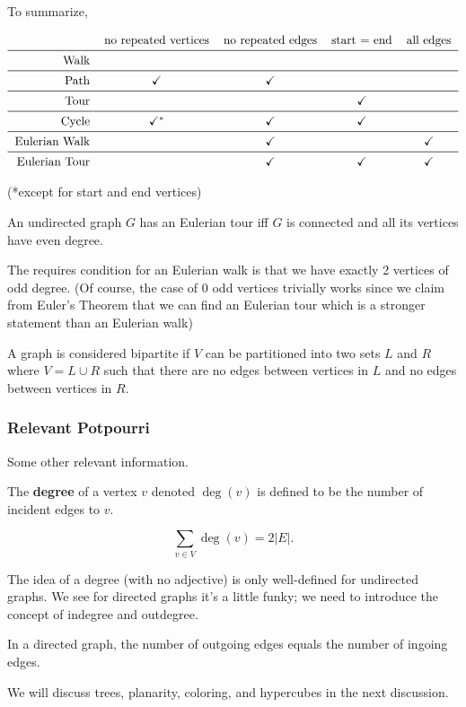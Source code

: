 To summarize,

\[\begin{tabular}{rcccc}
    & no repeated vertices & no repeated edges & start = end & all edges \\\midrule
Walk & & & & \\\midrule
Path & \checkmark & \checkmark & & \\\midrule
Tour & & & \checkmark & \\\midrule
Cycle & \checkmark$^\ast$ & \checkmark & \checkmark & \\\midrule
Eulerian Walk & & \checkmark & & \checkmark \\\midrule
Eulerian Tour & & \checkmark & \checkmark & \checkmark
\end{tabular} \]

(*except for start and end vertices)

\begin{theorem}
    An undirected graph $G$ has an Eulerian tour iff $G$ is connected and all its vertices have even degree. 
\end{theorem}

The requires condition for an Eulerian walk is that we have exactly 2 vertices of odd degree. (Of course, the case of 0 odd vertices trivially works since we claim from Euler's Theorem that we can find an Eulerian tour which is a stronger statement than an Eulerian walk)

\begin{definition}[Bipartite]
    A graph is considered bipartite if $V$ can be partitioned into two sets $L$ and $R$ where $V = L \cup R$ such that there are no edges between vertices in $L$ and no edges between vertices in $R$. 
\end{definition}

\subsubsection{Relevant Potpourri}

Some other relevant information. 

\begin{definition}[Degree]
    The \textbf{degree} of a vertex $v$ denoted $\deg(v)$ is defined to be the number of incident edges to $v$. 
\end{definition}

\begin{lemma}[Handshake]
    \[ \sum_{v \in V} \deg(v) = 2|E|. \]
\end{lemma}

The idea of a degree (with no adjective) is only well-defined for undirected graphs. We see for directed graphs it's a little funky; we need to introduce the concept of indegree and outdegree. 

In a directed graph, the number of outgoing edges equals the number of ingoing edges. 

We will discuss trees, planarity, coloring, and hypercubes in the next discussion. 